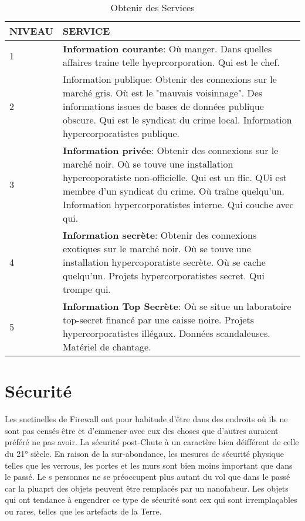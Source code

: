 \begin{table} \caption{Obtenir des Services} \begin{tabularx}{\textwidth}{|l|X|} \hline

NIVEAU &SERVICE \\ \hline

1 &\textbf{Information courante}: Où manger. Dans quelles affaires traine telle hyeprcorporation. Qui est le chef. \\ \hline

2 &Information publique: Obtenir des connexions sur le marché gris. Où est le "mauvais voisinnage". Des informations issues de bases de données publique obscure. Qui est le syndicat du crime local. Information hypercorporatistes publique. \\ \hline

3 &\textbf{Information privée}: Obtenir des connexions sur le marché noir. Où se touve une installation hypercoporatiste non-officielle. Qui est un flic. QUi est membre d'un syndicat du crime. Où traîne quelqu'un. Information hypercorporatistes interne. Qui couche avec qui. \\ \hline

4 &\textbf{Information secrète}: Obtenir des connexions exotiques sur le marché noir. Où se touve une installation hypercoporatiste secrète. Où se cache quelqu'un. Projets hypercorporatistes secret. Qui trompe qui. \\ \hline

5 &\textbf{Information Top Secrète}: Où se situe un laboratoire top-secret financé par une caisse noire. Projets hypercorporatistes illégaux. Données scandaleuses. Matériel de chantage. \\ \hline

\end{tabularx} \end{table} 

\section{Sécurité} 

Les snetinelles de Firewall ont pour habitude d'être dans des endroits où ils ne sont pas censés être et d'emmener avec eux des choses que d'autres auraient préféré ne pas avoir. La sécurité post-Chute à un caractère bien déifférent de celle du 21° siècle. En raison de la sur-abondance, les mesures de sécurité physique telles que les verrous, les portes et les murs sont bien moins important que dans le passé. Le s personnes ne se préoccupent plus autant du vol que dans le passé car la pluaprt des objets peuvent être remplacés par un nanofabeur. Les objets qui ont tendance à engendrer ce type de sécurité sont cex qui sont irremplaçables ou rares, telles que les artefacts de la Terre. 

